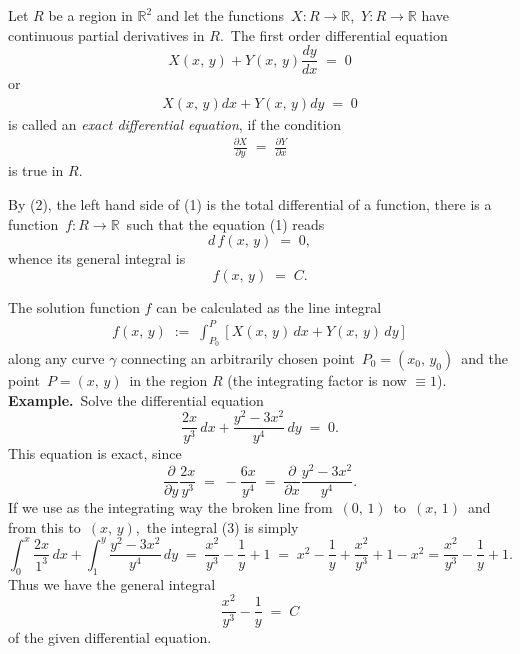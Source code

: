 \documentclass[12pt]{article}
\theoremstyle{definition}
\begin{document}
Let $R$ be a region in $\mathbb{R}^2$ and let the functions\, $X\!: R \to \mathbb{R}$,\, $Y\!: R \to \mathbb{R}$ have continuous partial derivatives in $R$.\, The first order differential equation
$$X(x,\,y)+Y(x,\,y)\frac{dy}{dx} \;=\; 0$$
or
\begin{align}
X(x,\,y)dx+Y(x,\,y)dy \;=\; 0
\end{align}
is called an {\em exact differential equation}, if the condition
\begin{align}
\frac{\partial X}{\partial y} \;=\; \frac{\partial Y}{\partial x}
\end{align}
is true in $R$.

By (2), the left hand side of (1) is the total differential of a function, there is a function\, $f\!: R \to \mathbb{R}$\, such that the equation (1) reads
$$d\,f(x,\,y) \;=\; 0,$$
whence its general integral is
$$f(x,\,y) \;=\; C.$$

The solution function $f$ can be calculated as the line integral
\begin{align}
f(x,\,y) \;:=\; \int_{P_0}^P [X(x,\,y)\,dx+Y(x,\,y)\,dy]
\end{align}
along any curve $\gamma$ connecting an arbitrarily chosen point \,$P_0 = (x_0,\,y_0)$\, and the point\, $P = (x,\,y)$\, in the region $R$ (the integrating factor is now $\equiv 1$).\\

\textbf{Example.}\, Solve the differential equation
$$\frac{2x}{y^3}\,dx+\frac{y^2-3x^2}{y^4}\,dy \;=\; 0.$$
This equation is exact, since
$$\frac{\partial}{\partial y}\frac{2x}{y^3} \;=\; -\frac{6x}{y^4} 
\;=\; \frac{\partial}{\partial x}\frac{y^2-3x^2}{y^4}.$$
If we use as the integrating way the broken line from\, $(0,\,1)$\, to\, $(x,\,1)$\, and from this to\, $(x,\,y)$,\, the integral (3) is simply
$$\int_0^x\frac{2x}{1^3}\,dx+\!\int_1^y\frac{y^2-3x^2}{y^4}\,dy \;=\; \frac{x^2}{y^3}-\frac{1}{y}+1 
\;=\; x^2-\frac{1}{y}+\frac{x^2}{y^3}+1-x^2 = \frac{x^2}{y^3}-\frac{1}{y}+1.$$
Thus we have the general integral
$$\frac{x^2}{y^3}-\frac{1}{y} \;=\; C$$
of the given differential equation.
\end{document}
